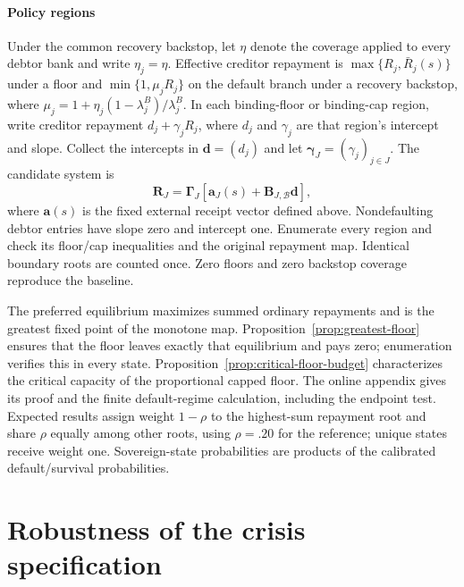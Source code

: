 \paragraph{Policy regions}
Under the common recovery backstop, let $\eta$ denote the coverage applied to every debtor bank and write $\eta_j=\eta$. Effective creditor repayment is $\max\{R_j,\bar R_j(s)\}$ under a floor and $\min\{1,\mu_jR_j\}$ on the default branch under a recovery backstop, where $\mu_j=1+\eta_j(1-\lambda_j^B)/\lambda_j^B$. In each binding-floor or binding-cap region, write creditor repayment $d_j+\gamma_jR_j$, where $d_j$ and $\gamma_j$ are that region's intercept and slope. Collect the intercepts in $\mathbf{d}=(d_j)$ and let $\boldsymbol{\gamma}_J=(\gamma_j)_{j\in J}$. The candidate system is
\begin{equation}
 [\mathbf{I}-\boldsymbol{\Gamma}_J\mathbf{B}_{JJ}\operatorname{diag}(\boldsymbol{\gamma}_J)]\mathbf{R}_J
    =\boldsymbol{\Gamma}_J[\mathbf{a}_J(s)+\mathbf{B}_{J,\mathcal B}\mathbf{d}],
 \label{eq:interbank_backstop_linear_system}
\end{equation}
where $\mathbf{a}(s)$ is the fixed external receipt vector defined above. Nondefaulting debtor entries have slope zero and intercept one. Enumerate every region and check its floor/cap inequalities and the original repayment map. Identical boundary roots are counted once. Zero floors and zero backstop coverage reproduce the baseline.

The preferred equilibrium maximizes summed ordinary repayments and is the greatest fixed point of the monotone map. Proposition~\ref{prop:greatest-floor} ensures that the floor leaves exactly that equilibrium and pays zero; enumeration verifies this in every state. Proposition~\ref{prop:critical-floor-budget} characterizes the critical capacity of the proportional capped floor. The online appendix gives its proof and the finite default-regime calculation, including the endpoint test. Expected results assign weight $1-\rho$ to the highest-sum repayment root and share $\rho$ equally among other roots, using $\rho=.20$ for the reference; unique states receive weight one. Sovereign-state probabilities are products of the calibrated default/survival probabilities.





\section{Robustness of the crisis specification}\label{app:ocr_robustness}


